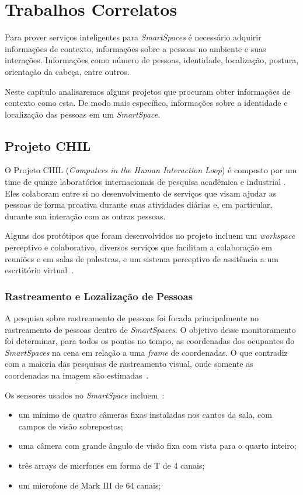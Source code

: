 \chapter{Trabalhos Correlatos}

Para prover serviços inteligentes para \textit{SmartSpaces} é necessário adquirir informações de contexto, informações sobre a pessoas no ambiente e suas interações. Informações como número de pessoas, identidade, localização, postura, orientação da cabeça, entre outros.

Neste capítulo analisaremos alguns projetos que procuram obter informações de contexto como esta. De modo mais específico, informações sobre a identidade e localização das pessoas em um \textit{SmartSpace}.

\section{Projeto CHIL}

O Projeto CHIL (\textit{Computers in the Human Interaction Loop}) é composto por um time de quinze laboratórios internacionais de pesquisa acadêmica e industrial . Eles colaboram entre si no desenvolvimento de serviços que visam ajudar as pessoas de forma proativa durante suas atividades diárias e, em particular, durante sua interação com as outras pessoas. 

Alguns dos protótipos que foram desenvolvidos no projeto incluem um \textit{workspace} perceptivo e colaborativo, diversos serviços que facilitam a colaboração em reuniões e em salas de palestras, e um sistema perceptivo de assitência a um escrtitório virtual~\cite{chil}.

\subsection{Rastreamento e Lozalização de Pessoas}

A pesquisa sobre rastreamento de pessoas foi focada principalmente no rastreamento de pessoas dentro de \textit{SmartSpaces}. O objetivo desse monitoramento foi determinar, para todos os pontos no tempo, as coordenadas dos ocupantes do \textit{SmartSpaces} na cena em relação a uma \textit{frame} de coordenadas. O que contradiz com a maioria das pesquisas de rastreamento visual, onde somente as coordenadas na imagem  são estimadas~\cite{chil}.

Os sensores usados no \textit{SmartSpace} incluem~\cite{chil}:
	
	\begin{itemize}
		\item um mínimo de quatro câmeras fixas instaladas nos cantos da sala, com campos de visão sobrepostos;
		\item uma câmera com grande ângulo de visão fixa com vista para o quarto inteiro;
		\item três arrays de micrfones em forma de T de 4 canais;
		\item um microfone de Mark III de 64 canais;
	\end{itemize}

